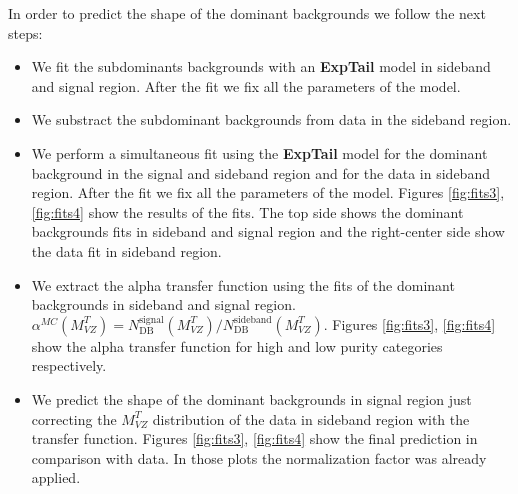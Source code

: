 In order to predict the shape of the dominant backgrounds we follow the next steps:

\begin{itemize}
\item
We fit the subdominants backgrounds with an \textbf{ExpTail} model in sideband and signal region. After the fit we fix all the parameters of the model.
\item
We substract the subdominant backgrounds from data in the sideband region.
\item
We perform a simultaneous fit using the \textbf{ExpTail} model for the dominant background in the signal and sideband region and for the data in sideband region.
After the fit we fix all the parameters of the model. Figures \ref{fig:fits3}, \ref{fig:fits4} show the results of the fits. The top side shows the dominant backgrounds fits in sideband and signal region and the right-center side show the data fit in sideband region.
\item
We extract the alpha transfer function using the fits of the dominant backgrounds in sideband and signal region. $\alpha^{MC}(M_{VZ}^{T})= N_{\text{DB}}^{\text{signal}}(M_{VZ}^{T})/N_{\text{DB}}^{\text{sideband}}(M_{VZ}^{T})$.  Figures \ref{fig:fits3}, \ref{fig:fits4} show the alpha transfer function for high and low purity categories respectively.
\item
We predict the shape of the dominant backgrounds in signal region just correcting the $M_{VZ}^{T}$ distribution of the data in sideband region with the transfer function. Figures \ref{fig:fits3}, \ref{fig:fits4} show the final prediction in comparison with data. In those plots the normalization factor was already applied.
\end{itemize}

